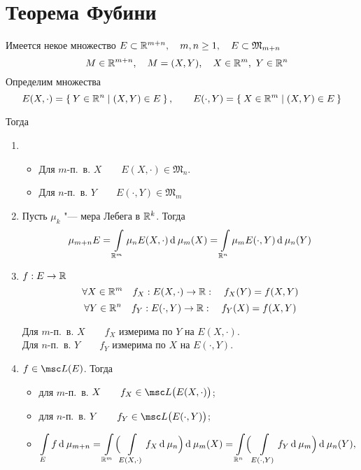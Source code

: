 \section{Теорема Фубини}

\begin{theorem}
	Имеется некое множество $ E \subset \mathbb{R}^{m + n}, \quad m, n \ge 1, \quad E \subset \mathfrak M_{m + n} $
	$$ \quad M \in \mathbb{R}^{m + n}, \quad M = (X, Y), \quad X \in \mathbb{R}^m, ~ Y \in \mathbb{R}^n $$
	Определим множества
	$$ E (X, \cdot) = \Set{ Y \in \ensuremath{\mathbb{R}}^n \mid (X, Y) \in E}, \qquad E(\cdot, Y) = \Set{X \in \ensuremath{\mathbb{R}}^m \mid (X, Y) \in E} $$

	Тогда
	\begin{enumerate}
		\item
			\begin{itemize}
			\item Для $ m $-п.~в. $ X \qquad E(X, \cdot) \in \mathfrak M_n $.
			\item Для $ n $-п.~в. $ Y \qquad E(\cdot, Y) \in \mathfrak M_m $
		\end{itemize}
		\item Пусть $ \mu_k $ "--- мера Лебега в $ \mathbb{R}^k $. Тогда
			$$ \mu_{m + n} E = \int\limits_{\mathbb{R}^m} \mu_n E(X, \cdot) \operatorname{d}^{} \mu_m(X) = \int\limits_{\mathbb{R}^n} \mu_m E(\cdot, Y) \operatorname{d}^{} \mu_n(Y) $$
		\item $ f : E \to \mathbb{R} $
			$$ \forall X \in \mathbb{R}^m \quad f_X : E(X, \cdot) \to \mathbb{R} : \quad f_X(Y) = f(X, Y) $$
			$$ \forall Y \in \mathbb{R}^n \quad f_Y : E(\cdot, Y) \to \mathbb{R} : \quad f_Y(X) = f(X, Y) $$

			Для $ m $-п.~в. $ X \qquad f_X $ измерима по $ Y $ на $ E(X, \cdot) $. \\
			Для $ n $-п.~в. $ Y \qquad f_Y $ измерима по $ X $ на $ E(\cdot, Y) $.
			
		\item $ f \in \msc L(E) $. Тогда
			\begin{itemize}
				\item для $ m $-п.~в. $ X \qquad f_X \in \msc L \bigl( E(X, \cdot) \bigr) $;
				\item для $ n $-п.~в. $ Y \qquad f_Y \in \msc L \bigl( E(\cdot, Y) \bigr) $;
				\item
					$$ \int\limits_E f \operatorname{d}^{} \mu_{m + n} = \int\limits_{\mathbb{R}^m} \Bigl( \int\limits_{E(X, \cdot)} f_X \operatorname{d}^{} \mu_n \Bigr) \operatorname{d}^{} \mu_m(X) = \int\limits_{\mathbb{R}^n} \Bigr(\int\limits_{E(\cdot, Y)} f_Y \operatorname{d}^{} \mu_m \Bigr) \operatorname{d}^{} \mu_n(Y), $$
			\end{itemize}
	\end{enumerate}
\end{theorem}

